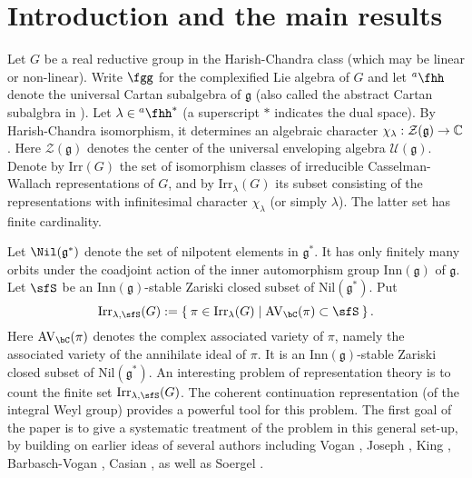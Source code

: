 \documentclass[12pt,a4paper]{amsart}
\newcommand{\AVC}{\mathrm{AV}_\bC}
\newcommand{\CZ}{{\mathcal {Z}}}
\newcommand{\g}{\mathfrak g}
\numberwithin{equation}{section}
\theoremstyle{remark}
\def\Irr{\mathrm{Irr}}
\def\hha{{}^a\fhh}
\begin{document}
\maketitle



\tableofcontents



\section{Introduction and the main results}\label{sec:intro}

Let $G$ be a real reductive group in the Harish-Chandra class (which may be
linear or non-linear). Write $\fgg$ for the complexified Lie algebra of $G$ and
let $\hha$ denote the universal Cartan subalgebra of $\g$ (also called the abstract Cartan subalgbra in \cite{V4}).
Let $\lambda \in \hha^*$ (a superscript $*$ indicates the dual space). By Harish-Chandra isomorphism, it
determines an algebraic character $\chi_\lambda: \CZ(\g)\rightarrow \C$. Here
$\CZ(\g)$ denotes the center of the universal enveloping algebra
$\mathcal U(\g)$. Denote by $\Irr(G)$ the set of isomorphism classes of
irreducible Casselman-Wallach representations of $G$, and by $\Irr_\lambda(G)$
its subset consisting of the representations with infinitesimal character
$\chi_\lambda$ (or simply $\lambda$). The latter set has finite cardinality.


Let $\Nil(\g^*)$ denote the set of nilpotent elements in $\g^*$. It has only
finitely many orbits under the coadjoint action of the inner automorphism group
$\mathrm{Inn}(\g)$ of $\g$. Let $\sfS$ be an $\mathrm{Inn}(\g)$-stable Zariski
closed subset of $\mathrm{Nil}(\g^*)$. Put
\[
  \Irr_{\lambda,\sfS}(G):=\Set{\pi \in \Irr_{\lambda}(G)| \text{$\AVC(\pi)\subset \sfS$} }.
\]
Here $\AVC(\pi)$ denotes the complex associated variety of $\pi$, namely the
associated variety of the annihilate ideal of $\pi$. It is an
$\mathrm{Inn}(\g)$-stable Zariski closed subset of $\mathrm{Nil}(\g^*)$. An
interesting problem of representation theory is to count the finite set $\Irr_{\lambda,\sfS}(G)$. The coherent continuation
representation (of the integral Weyl group) provides a powerful tool for this problem. The first goal of the paper is to give a systematic treatment of the problem in this general set-up, by building on earlier ideas of several authors including Vogan \cite{Vg}, Joseph \cite{J1,J2},  King \cite{King}, Barbasch-Vogan \cite{BVUni}, Casian \cite{Cas}, as well as Soergel \cite{Soergel}.
\end{document}

